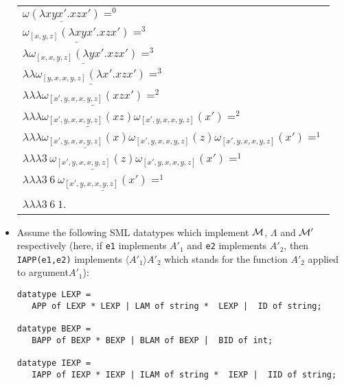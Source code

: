 \documentclass[11pt]{article}
\begin{document}
\begin{itemize}
\begin{center}
\begin{tabular}{l}
$\underline{\omega(\lambda xyx'.xzx')}
=^0 $\\$\underline{\omega_{[x,y,z]}(\lambda xyx'.xzx')} =^3 $\\
$\lambda\underline{\omega_{[x,x,y,z]}(\lambda yx'.xzx')} =^3 $\\
$\lambda\lambda\underline{\omega_{[y,x,x,y,z]}(\lambda x'.xzx')} =^3 $\\
$\lambda\lambda\lambda\underline{\omega_{[x',y,x,x,y,z]}(xzx')} =^2$\\
$ \lambda\lambda\lambda\underline{\omega_{[x',y,x,x,y,z]}(xz)}\omega_{[x',y,x,x,y,z]}(x') =^2$\\
$\lambda\lambda\lambda\underline{\omega_{[x',y,x,x,y,z]}(x)}\omega_{[x',y,x,x,y,z]}(z)\omega_{[x',y,x,x,y,z]}(x') =^1$\\$\lambda\lambda\lambda 3\:
\underline{\omega_{[x',y,x,x,y,z]}(z)}\omega_{[x',y,x,x,y,z]}(x') =^1 $\\$\lambda\lambda\lambda 3\: 6\:\underline{\omega_{[x',y,x,x,y,z]}(x')}=^1$\\$ \lambda\lambda\lambda 3\: 6\:1$.
\end{tabular}
\end{center}
\item
 Assume the following SML  datatypes which implement ${\cal M}$, $\Lambda$ and  ${\cal M}'$  respectively (here, if \texttt{e1} implements $A'_1$ and \texttt{e2} implements $A'_2$, then 
 \texttt{IAPP(e1,e2)} implements $\langle A'_1\rangle A'_2$ which  stands for the function $A'_2$ applied to argument$A'_1$):
\begin{verbatim}
datatype LEXP =  
   APP of LEXP * LEXP | LAM of string *  LEXP |  ID of string;

datatype BEXP =  
   BAPP of BEXP * BEXP | BLAM of BEXP |  BID of int;

datatype IEXP =  
   IAPP of IEXP * IEXP | ILAM of string *  IEXP |  IID of string;


\end{verbatim}
\end{itemize}
\end{document}
